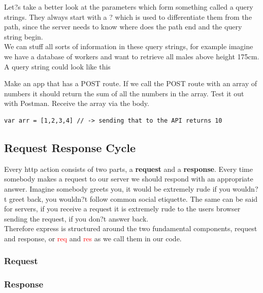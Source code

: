 \documentclass[a4paper]{article}
\begin{document}
Let?s take a better look at the parameters which form something called a query strings. They always start with a ? which is used to differentiate them from the path, since the server needs to know where does the path end and the query string begin.\\

We can stuff all sorts of information in these query strings, for example imagine we have a database of workers and want to retrieve all males above height 175cm. A query string could look like this
\\

\begin{eg}

\end{eg}


\begin{eg}
Make an app that has a POST route. If we call the POST route with an array of numbers it should return the sum of all the numbers in the array. Test it out with Postman. Receive the array via the body.
\end{eg}

\begin{lstlisting}
var arr = [1,2,3,4] // -> sending that to the API returns 10
\end{lstlisting}

\subsection{Request Response Cycle}
Every http action consists of two parts, a \textbf{request} and a \textbf{response}. Every time somebody makes a request to our server we should respond with an appropriate answer. Imagine somebody greets you, it would be extremely rude if you wouldn?t greet back, you wouldn?t follow common social etiquette. The same can be said for servers, if you receive a request it is extremely rude to the users browser sending the request, if you don?t answer back.
\\
Therefore express is structured around the two fundamental components, request and response, or \textcolor{red}{req} and \textcolor{red}{res} as we call them in our code.

\subsubsection{Request}

\subsubsection{Response}
\end{document}
